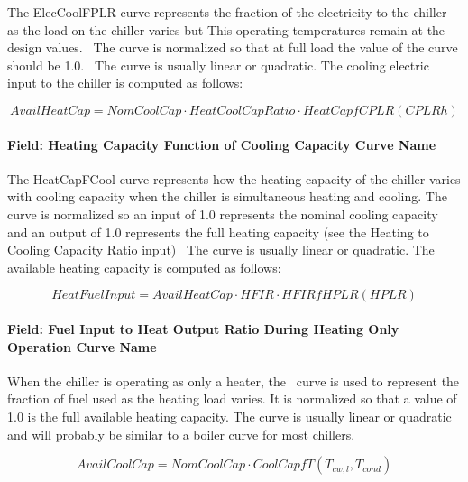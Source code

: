 The ElecCoolFPLR curve represents the fraction of the electricity to the chiller as the load on the chiller varies but This operating temperatures remain at the design values.~ The curve is normalized so that at full load the value of the curve should be 1.0.~ The curve is usually linear or quadratic. The cooling electric input to the chiller is computed as follows:

\begin{equation}
    AvailHeatCap = NomCoolCap \cdot HeatCoolCapRatio \cdot HeatCapfCPLR(CPLRh)
\end{equation}

\paragraph{Field: Heating Capacity Function of Cooling Capacity Curve Name}\label{field-heating-capacity-function-of-cooling-capacity-curve-name}

The HeatCapFCool curve represents how the heating capacity of the chiller varies with cooling capacity when the chiller is simultaneous heating and cooling. The curve is normalized so an input of 1.0 represents the nominal cooling capacity and an output of 1.0 represents the full heating capacity (see the Heating to Cooling Capacity Ratio input)~ The curve is usually linear or quadratic. The available heating capacity is computed as follows:

\begin{equation}
    HeatFuelInput = AvailHeatCap \cdot HFIR \cdot HFIRfHPLR(HPLR)
\end{equation}

\paragraph{Field: Fuel Input to Heat Output Ratio During Heating Only Operation Curve Name}\label{field-fuel-input-to-heat-output-ratio-during-heating-only-operation-curve-name}

When the chiller is operating as only a heater, the~ curve is used to represent the fraction of fuel used as the heating load varies. It is normalized so that a value of 1.0 is the full available heating capacity. The curve is usually linear or quadratic and will probably be similar to a boiler curve for most chillers.

\begin{equation}
    AvailCoolCap = NomCoolCap \cdot CoolCapfT({T_{cw,l}},{T_{cond}})
\end{equation}

